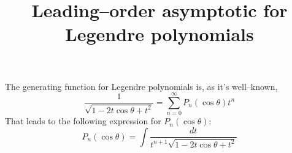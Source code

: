 \documentclass{article}
\title{Leading--order asymptotic for Legendre polynomials}
\begin{document}
\maketitle
The generating function for Legendre polynomials is, as it's well--known,
\begin{equation}
	\frac{1}{\sqrt{1 - 2t\cos{\theta}  + t^2}} =\sum_{n = 0}^{\infty} P_n(\cos \theta) t^n 
\end{equation}
That leads to the following expression for $P_n(\cos \theta)$:
\begin{equation}
	P_n(\cos \theta) = \int \frac{dt}{t^{n+1}{\sqrt{1 - 2t\cos{\theta} + t^2}}}
\end{equation}
\end{document}
